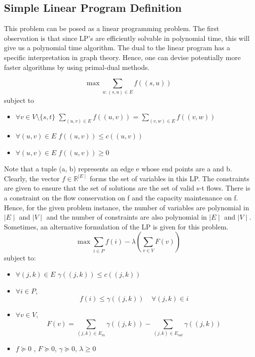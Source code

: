 \documentclass[BTech]{iitmdiss}
\begin{document}
	\subsection{Simple Linear Program Definition}
	  This problem can be posed as a linear programming problem. The first observation is that since LP's are efficiently solvable in polynomial
	  time, this will give us a polynomial time algorithm. The dual to the linear
	  program has a specific interpretation in graph theory. Hence, one can devise potentially more faster algorithms by using primal-dual
	  methods.
	  
	  $$\max \displaystyle\sum_{u:(s,u) \in E} f((s,u))$$
	  subject to
	  \begin{itemize}
	   \item
	      $\forall v \in V \setminus \{s,t\}$ $\displaystyle\sum_{(u,v) \in E} f((u,v))$ = $\displaystyle\sum_{(v,w) \in E} f((v,w))$
	   \item
	      $\forall (u,v) \in E$ $f((u,v)) \leq c((u,v))$
	   \item
	      $\forall(u,v) \in E$ $f((u,v)) \geq 0$
	      
	  \end{itemize}
	  
	  Note that a tuple (a, b) represents an edge e whose end points are a and b. \\
	  
	  Clearly, the vector $f \in \mathbb{R}^{\mid E\mid }$ forms the set of variables in this LP. The constraints are given to ensure that the set of 
	  solutions are the set of valid s-t flows. There is a constraint on the flow conservation on f and the capacity maintenance on f. Hence, for the
	  given problem instance, the number of variables are polynomial in $\mid E\mid $ and $\mid V\mid $ and the number of constraints are also polynomial in $\mid E\mid $
	  and $\mid V\mid $. \\
	  
	  Sometimes, an alternative formulation of the LP is given for this problem. 
	  $$ \max \displaystyle\sum_{i \in P} f(i) - \lambda (\displaystyle\sum_{v \in V} F(v)) $$
	  subject to:
	  
	  \begin{itemize}
	   \item 
	      $\forall (j,k) \in E$  $\gamma((j,k)) \leq c((j,k))$
	   \item
	      $\forall i \in P$, 
		$$f(i) \leq \gamma((j,k))~~~~~\forall (j,k) \in i$$
	   \item
	      $\forall v \in V$,
	      $$F(v) = \displaystyle\sum_{(j,k) \in E_{in}} \gamma((j,k)) - \displaystyle\sum_{(j,k) \in E_{out}} \gamma((j,k))$$
	   \item
	      $f \succeq 0$ , $F \succeq 0$, $\gamma \succeq 0$, $\lambda \geq 0$
	  \end{itemize}
	  
\end{document}
